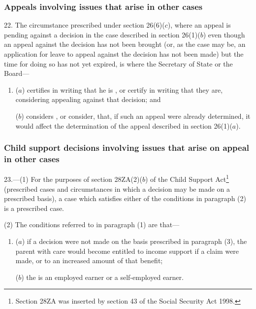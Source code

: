 \documentclass[12pt,a4paper]{article}
\begin{document}

\subsubsection[22. Appeals involving issues that arise in other cases]{Appeals involving issues that arise in other cases}

22.  The circumstance prescribed under section 26(6)($c$), where an appeal is pending against a decision in the case described in section 26(1)($b$) even though an appeal against the decision has not been brought (or, as the case may be, an application for leave to appeal against the decision has not been made) but the time for doing so has not yet expired, is where the Secretary of State
or the Board—  %
\begin{enumerate}\item[]
($a$) certifies in writing that he is%
, or certify in writing that they are,  %
considering appealing against that decision; and

($b$) considers%
, or consider,  %
that, if such an appeal were already determined, it would affect the determination of the appeal described in section 26(1)($a$).
\end{enumerate}


\subsubsection[23. Child support decisions involving issues that arise on appeal in other cases]{Child support decisions involving issues that arise on appeal in other cases}

23.—(1) For the purposes of section 28ZA(2)($b$) of the Child Support Act\footnote{\frenchspacing Section 28ZA was inserted by section 43 of the Social Security Act 1998.} (prescribed cases and circumstances in which a decision may be made on a prescribed basis), a case which satisfies either of the conditions in paragraph (2) is a prescribed case.

(2) The conditions referred to in paragraph (1) are that—
\begin{enumerate}\item[]
($a$) if a decision were not made on the basis prescribed in paragraph (3), the parent with care would become entitled to income support if a claim were made, or to an increased amount of that benefit;

($b$) the 
%
is an employed earner or a self-employed earner.
\end{enumerate}
\end{document}
